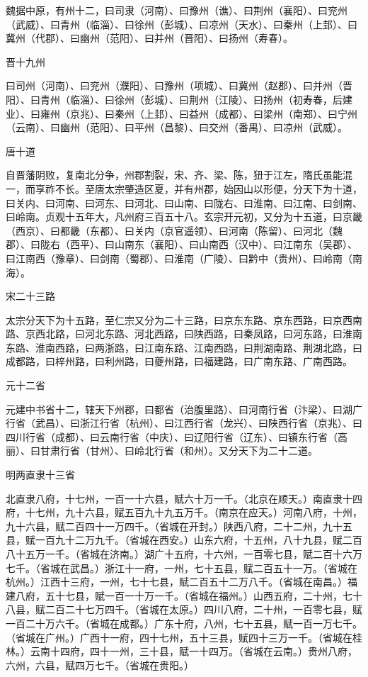 \documentclass[a4paper,12pt,UTF8,twoside]{ctexbook}
\begin{document}
	魏据中原，有州十二，曰司隶（河南）、曰豫州（谯）、曰荆州（襄阳）、曰兖州（武威）、曰青州（临淄）、曰徐州（彭城）、曰凉州（天水）、曰秦州（上邽）、曰冀州（代郡）、曰幽州（范阳）、曰并州（晋阳）、曰扬州（寿春）。
	
	晋十九州
	
	曰司州（河南）、曰兖州（濮阳）、曰豫州（项城）、曰冀州（赵郡）、曰并州（晋阳）、曰青州（临淄）、曰徐州（彭城）、曰荆州（江陵）、曰扬州（初寿春，后建业）、曰雍州（京兆）、曰秦州（上邽）、曰益州（成都）、曰梁州（南郑）、曰宁州（云南）、曰幽州（范阳）、曰平州（昌黎）、曰交州（番禺）、曰凉州（武威）。
	
	唐十道
	
	自晋藩阴败，复南北分争，州郡割裂，宋、齐、梁、陈，狃于江左，隋氏虽能混一，而享祚不长。至唐太宗肇造区夏，并有州郡，始因山以形便，分天下为十道，曰关内、曰河南、曰河东、曰河北、曰山南、曰陇右、曰淮南、曰江南、曰剑南、曰岭南。贞观十五年大，凡州府三百五十八。玄宗开元初，又分为十五道，曰京畿（西京）、曰都畿（东都）、曰关内（京官遥领）、曰河南（陈留）、曰河北（魏郡）、曰陇右（西平）、曰山南东（襄阳）、曰山南西（汉中）、曰江南东（吴郡）、曰江南西（豫章）、曰剑南（蜀郡）、曰淮南（广陵）、曰黔中（贵州）、曰岭南（南海）。
	
	宋二十三路
	
	太宗分天下为十五路，至仁宗又分为二十三路，曰京东东路、京东西路，曰京西南路、京西北路，曰河北东路、河北西路，曰陕西路，曰秦凤路，曰河东路，曰淮南东路、淮南西路，曰两浙路，曰江南东路、江南西路，曰荆湖南路、荆湖北路，曰成都路，曰梓州路，曰利州路，曰夔州路，曰福建路，曰广南东路、广南西路。
	
	元十二省
	
	元建中书省十二，辖天下州郡，曰都省（治腹里路）、曰河南行省（汴梁）、曰湖广行省（武昌）、曰浙江行省（杭州）、曰江西行省（龙兴）、曰陕西行省（京兆）、曰四川行省（成都）、曰云南行省（中庆）、曰辽阳行省（辽东）、曰镇东行省（高丽）、曰甘肃行省（甘州）、曰岭北行省（和州）。又分天下为二十二道。
	
	明两直隶十三省
	
	北直隶八府，十七州，一百一十六县，赋六十万一千。（北京在顺天。）南直隶十四府，十七州，九十六县，赋五百九十九五万千。（南京在应天。）河南八府，十州，九十六县，赋二百四十一万四千。（省城在开封。）陕西八府，二十二州，九十五县，赋一百九十二万九千。（省城在西安。）山东六府，十五州，八十九县，赋二百八十五万一千。（省城在济南。）湖广十五府，十六州，一百零七县，赋二百十六万七千。（省城在武昌。）浙江十一府，一州，七十五县，赋二百五十一万。（省城在杭州。）江西十三府，一州，七十七县，赋二百五十二万八千。（省城在南昌。）福建八府，五十七县，赋一百一十万一千。（省城在福州。）山西五府，二十州，七十八县，赋二百二十七万四千。（省城在太原。）四川八府，二十州，一百零七县，赋一百二十万六千。（省城在成都。）广东十府，八州，七十五县，赋一百一万七千。（省城在广州。）广西十一府，四十七州，五十三县，赋四十三万一千。（省城在桂林。）云南十四府，四十一州，三十县，赋一十四万。（省城在云南。）贵州八府，六州，六县，赋四万七千。（省城在贵阳。）
	
\end{document}
